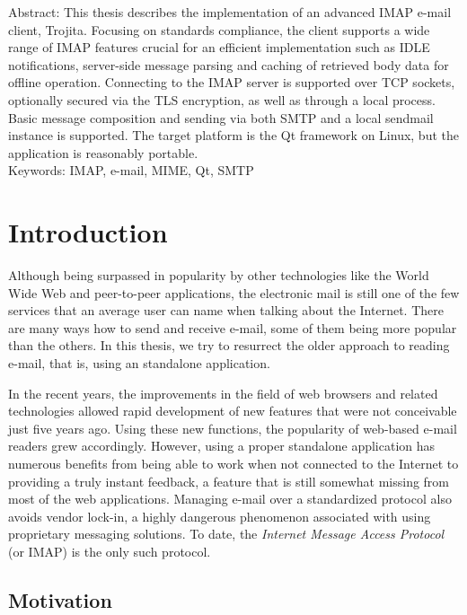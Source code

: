 \documentclass[12pt,notitlepage]{report}
\newcommand{\trojita}{Trojita\xspace}
\begin{document}
\noindent Abstract: This thesis describes the implementation of an advanced IMAP
e-mail client, \trojita.  Focusing on standards compliance, the client supports
a wide range of IMAP features crucial for an efficient implementation such as IDLE
notifications, server-side message parsing and caching of retrieved body data
for offline operation.  Connecting to the IMAP server is supported over TCP
sockets, optionally secured via the TLS encryption, as well as through a local
process.  Basic message composition and sending via both SMTP and a local
sendmail instance is supported.  The target platform is the Qt framework on
Linux, but the application is reasonably portable.
\\

\noindent Keywords: IMAP, e-mail, MIME, Qt, SMTP

\newpage

\chapter{Introduction}

Although being surpassed in popularity by other technologies like the World Wide
Web and peer-to-peer applications, the electronic mail is still one of the few
services that an average user can name when talking about the Internet.  There are
many ways how to send and receive e-mail, some of them being more popular
than the others.  In this thesis, we try to resurrect the older approach to
reading e-mail, that is, using an standalone application.

In the recent years, the improvements in the field of web browsers and related
technologies allowed rapid development of new features that were not conceivable
just five years ago.  Using these new functions, the popularity of web-based
e-mail readers grew accordingly.  However, using a proper standalone application
has numerous benefits from being able to work when not connected to the Internet
to providing a truly instant feedback, a feature that is still somewhat missing
from most of the web applications.  Managing e-mail over a standardized protocol
also avoids vendor lock-in, a highly dangerous phenomenon associated with
using proprietary messaging solutions.  To date, the {\em Internet Message
Access Protocol}~\cite{rfc-imap} (or IMAP) is the only such protocol.

\section{Motivation}
\end{document}
